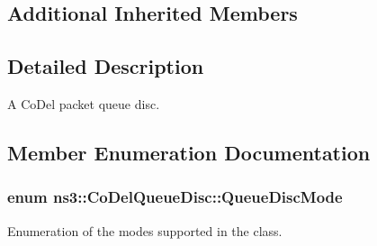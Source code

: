\subsection*{Additional Inherited Members}


\subsection{Detailed Description}
A Co\+Del packet queue disc. 

\subsection{Member Enumeration Documentation}
\subsubsection[{\texorpdfstring{Queue\+Disc\+Mode}{QueueDiscMode}}]{\setlength{\rightskip}{0pt plus 5cm}enum {\bf ns3\+::\+Co\+Del\+Queue\+Disc\+::\+Queue\+Disc\+Mode}}\hypertarget{classns3_1_1CoDelQueueDisc_a6149d83cd9f193b54b55efa7309b79eb}{}\label{classns3_1_1CoDelQueueDisc_a6149d83cd9f193b54b55efa7309b79eb}


Enumeration of the modes supported in the class. 


